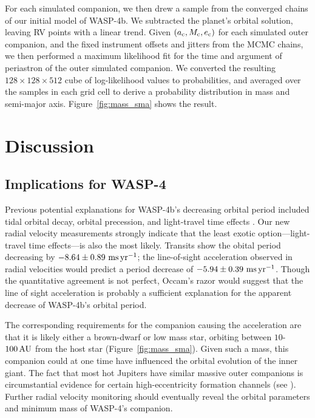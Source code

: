 \documentclass[12pt,twocolumn,tighten]{aastex62}
\begin{document}
For each simulated companion, we then drew a sample from the converged
chains of our initial model of WASP-4b. We
subtracted the planet's orbital solution, leaving RV points with
a linear trend.  Given $(a_{\rm c}, M_{\rm c}, e_{\rm c})$ for each
simulated outer companion, and the fixed instrument offsets and
jitters from the MCMC chains, we then performed a maximum likelihood
fit for the time and argument of periastron of the outer simulated
companion.  We converted the resulting $128\times128\times512$ cube of
log-likelihood values to probabilities, and averaged over the
samples in each grid cell to derive a probability distribution in mass
and semi-major axis.  Figure~\ref{fig:mass_sma} shows the result.



\section{Discussion}
\label{sec:discussion}

\subsection{Implications for WASP-4}
Previous potential explanations for WASP-4b's decreasing orbital
period included tidal orbital decay, orbital precession, and
light-travel time effects \citep{bouma_wasp4b_2019}.  Our new radial
velocity measurements strongly indicate that the least exotic
option---light-travel time effects---is also the most likely.
Transits show the obital period decreasing by $- 8.64 \pm 0.89~{\rm
ms}\,{\rm yr}^{-1}$; the line-of-sight acceleration observed in radial
velocities would predict a period decrease of $-5.94 \pm 0.39~{\rm
ms}\,{\rm yr}^{-1}$.  Though the quantitative agreement is not
perfect, Occam's razor would suggest that the line of sight
acceleration is probably a sufficient explanation for the apparent
decrease of WASP-4b's orbital period.

The corresponding requirements for the companion causing the
acceleration are that it is likely either a brown-dwarf or low mass
star, orbiting between $10$-$100\,{\rm AU}$ from the host star
(Figure~\ref{fig:mass_sma}).  Given such a mass, this companion could
at one time have influenced the orbital evolution of the inner giant.
The fact that most hot Jupiters have similar massive outer
companions \citep{knutson_friends_2014,bryan_statistics_2016} is
circumstantial evidence for certain high-eccentricity formation
channels (see \citealt{dawson_johnson_2018}).
Further radial velocity monitoring should eventually reveal the
orbital parameters and minimum mass of WASP-4's companion.
\end{document}
